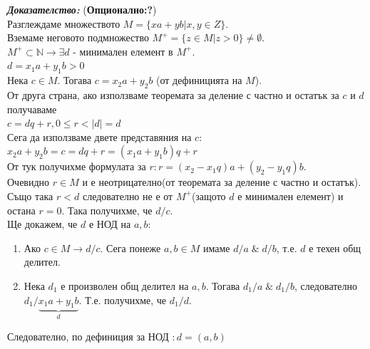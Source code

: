 \documentclass[11pt]{article} %
\newcommand{\italicBold}[1]{\textbf{\emph{#1}}}
\newcommand{\proof}{\italicBold{Доказателство: }}
\newcommand{\curlies}[1]{\{#1\}}
\newcommand{\enumNum}{\renewcommand{\theenumi}{\arabic{enumi}}}
\begin{document}
\proof (\textbf{Опционално:?})\\
Разглеждаме множеството $M = \curlies{xa + yb|x,y \in Z}$.\\
Вземаме неговото подмножество $M^{+}=\curlies{z \in M|z>0}\neq \emptyset$.\\
$M^{+}\subset \mathbb{N} \rightarrow \exists d$ - минимален елемент в $M^{+}$.\\
$d = x_{1}a+y_{1}b > 0$\\
Нека $c \in M$. Тогава $c = x_{2}a + y_{2}b$ (от дефиницията на $M$).\\
От друга страна, ако използваме теоремата за деление с частно и остатък за $c$ и $d$ получаваме\\
$c = dq+r, 0\leq r < |d| = d$\\
Сега да използваме двете представяния на $c$:\\
$x_{2}a+y_{2}b=c=dq+r=(x_{1}a+y_{1}b)q+r$\\
От тук получихме формулата за $r:r=(x_{2}-x_{1}q)a+(y_{2}-y_{1}q)b$.\\
Очевидно $r \in M$ и е неотрицателно(от теоремата за деление с частно и остатък). Също така $r < d$ следователно не е от $M^{+}$(защото $d$ е минимален елемент) и остана $r=0$. Така получихме, че $d / c$.\\
Ще докажем, че $d$ е НОД на $a,b$:\\

\enumNum
\begin{enumerate}
	\item Ако $c \in M \rightarrow d / c$. Сега понеже $a,b \in M$ имаме $d / a \;\&\; d / b$, т.е. $d$ е техен общ делител.\\
	\item Нека $d_{1}$ е произволен общ делител на $a,b$. Тогава $d_{1} / a \;\&\; d_{1} / b$, следователно $d_{1} / \underbrace{x_{1}a+y_{1}b}_{d} $. Т.е. получихме, че $d_{1} / d$. \\ 
\end{enumerate}
Следователно, по дефиниция за НОД $: d = (a,b)$\\\par
\end{document}
